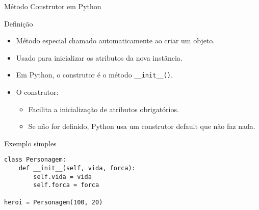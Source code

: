 \begin{frame}[fragile]{Método Construtor em Python}

    \begin{block}{Definição}
        \begin{itemize}
            \item Método especial chamado automaticamente ao criar um objeto.
            \item Usado para inicializar os atributos da nova instância.
            \item Em Python, o construtor é o método \texttt{\_\_init\_\_()}.
            \item O construtor:
                  \begin{itemize}
                      \item Facilita a inicialização de atributos obrigatórios.
                      \item Se não for definido, Python usa um construtor default que não faz nada.
                  \end{itemize}
        \end{itemize}
    \end{block}

    \begin{exampleblock}{Exemplo simples}
        \begin{verbatim}
class Personagem:
    def __init__(self, vida, forca):
        self.vida = vida
        self.forca = forca

heroi = Personagem(100, 20)
\end{verbatim}
    \end{exampleblock}

\end{frame}

